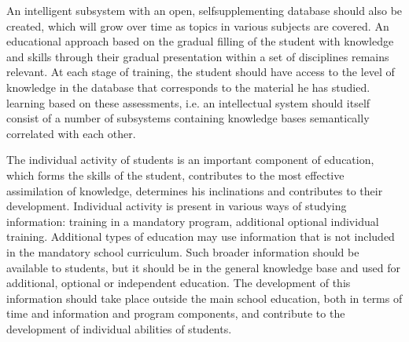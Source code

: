 \documentclass[a4paper, 10pt,twocolumn]{article}
\begin{document}
An intelligent subsystem with an open, selfsupplementing database should also be created, which
will grow over time as topics in various subjects are
covered. An educational approach based on the gradual
filling of the student with knowledge and skills through
their gradual presentation within a set of disciplines
remains relevant. At each stage of training, the student
should have access to the level of knowledge in the
database that corresponds to the material he has studied.
learning based on these assessments, i.e. an intellectual
system should itself consist of a number of subsystems
containing knowledge bases semantically correlated with
each other.

The individual activity of students is an important
component of education, which forms the skills of the
student, contributes to the most effective assimilation of
knowledge, determines his inclinations and contributes
to their development. Individual activity is present in
various ways of studying information: training in a
mandatory program, additional optional individual training. Additional types of education may use information
that is not included in the mandatory school curriculum.
Such broader information should be available to students,
but it should be in the general knowledge base and
used for additional, optional or independent education.
The development of this information should take place
outside the main school education, both in terms of time
and information and program components, and contribute
to the development of individual abilities of students.
\end{document}
